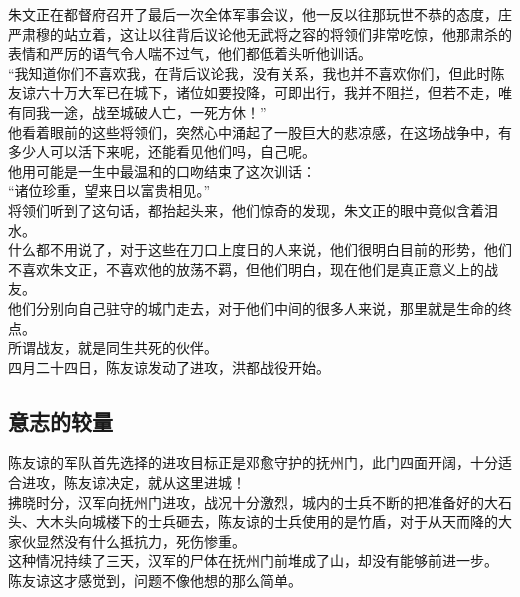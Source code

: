 \begin{multicols}{\theparacolNo}
朱文正在都督府召开了最后一次全体军事会议，他一反以往那玩世不恭的态度，庄严肃穆的站立着，这让以往背后议论他无武将之容的将领们非常吃惊，他那肃杀的表情和严厉的语气令人喘不过气，他们都低着头听他训话。\\

“我知道你们不喜欢我，在背后议论我，没有关系，我也并不喜欢你们，但此时陈友谅六十万大军已在城下，诸位如要投降，可即出行，我并不阻拦，但若不走，唯有同我一途，战至城破人亡，一死方休！”\\

他看着眼前的这些将领们，突然心中涌起了一股巨大的悲凉感，在这场战争中，有多少人可以活下来呢，还能看见他们吗，自己呢。\\

他用可能是一生中最温和的口吻结束了这次训话：\\

“诸位珍重，望来日以富贵相见。”\\

将领们听到了这句话，都抬起头来，他们惊奇的发现，朱文正的眼中竟似含着泪水。\\

什么都不用说了，对于这些在刀口上度日的人来说，他们很明白目前的形势，他们不喜欢朱文正，不喜欢他的放荡不羁，但他们明白，现在他们是真正意义上的战友。\\

他们分别向自己驻守的城门走去，对于他们中间的很多人来说，那里就是生命的终点。\\

所谓战友，就是同生共死的伙伴。\\

四月二十四日，陈友谅发动了进攻，洪都战役开始。\\

\subsection{意志的较量}
陈友谅的军队首先选择的进攻目标正是邓愈守护的抚州门，此门四面开阔，十分适合进攻，陈友谅决定，就从这里进城！\\

拂晓时分，汉军向抚州门进攻，战况十分激烈，城内的士兵不断的把准备好的大石头、大木头向城楼下的士兵砸去，陈友谅的士兵使用的是竹盾，对于从天而降的大家伙显然没有什么抵抗力，死伤惨重。\\

这种情况持续了三天，汉军的尸体在抚州门前堆成了山，却没有能够前进一步。\\

陈友谅这才感觉到，问题不像他想的那么简单。\\


\end{multicols}
